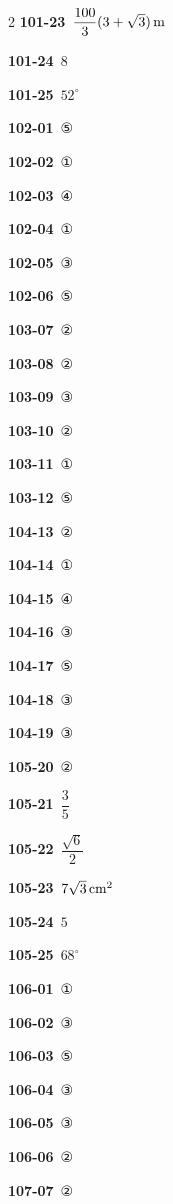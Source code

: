\documentclass[10pt,a4paper]{article}
\begin{document}
\begin{multicols}{2}
\noindent\textbf{101-23}\ $\dfrac{100}{3}(3+\sqrt{3})\mkern3mu \mathrm{m}$\par
\noindent\textbf{101-24}\ $8$\par
\noindent\textbf{101-25}\ $52^\circ$\par
\noindent\textbf{102-01}\ ⑤\par
\noindent\textbf{102-02}\ ①\par
\noindent\textbf{102-03}\ ④\par
\noindent\textbf{102-04}\ ①\par
\noindent\textbf{102-05}\ ③\par
\noindent\textbf{102-06}\ ⑤\par
\noindent\textbf{103-07}\ ②\par
\noindent\textbf{103-08}\ ②\par
\noindent\textbf{103-09}\ ③\par
\noindent\textbf{103-10}\ ②\par
\noindent\textbf{103-11}\ ①\par
\noindent\textbf{103-12}\ ⑤\par
\noindent\textbf{104-13}\ ②\par
\noindent\textbf{104-14}\ ①\par
\noindent\textbf{104-15}\ ④\par
\noindent\textbf{104-16}\ ③\par
\noindent\textbf{104-17}\ ⑤\par
\noindent\textbf{104-18}\ ③\par
\noindent\textbf{104-19}\ ③\par
\noindent\textbf{105-20}\ ②\par
\noindent\textbf{105-21}\ $\dfrac{3}{5}$\par
\noindent\textbf{105-22}\ $\dfrac{\sqrt{6}}{2}$\par
\noindent\textbf{105-23}\ $7\sqrt{3}\mkern3mu \mathrm{cm}^2$\par
\noindent\textbf{105-24}\ $5$\par
\noindent\textbf{105-25}\ $68^\circ$\par
\noindent\textbf{106-01}\ ①\par
\noindent\textbf{106-02}\ ③\par
\noindent\textbf{106-03}\ ⑤\par
\noindent\textbf{106-04}\ ③\par
\noindent\textbf{106-05}\ ③\par
\noindent\textbf{106-06}\ ②\par
\noindent\textbf{107-07}\ ②\par

\end{multicols}
\end{document}
